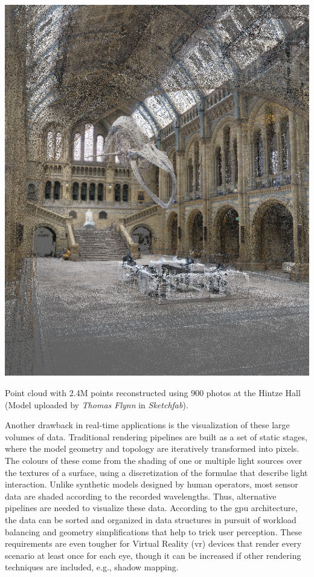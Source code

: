 \begin{marginfigure}[.5cm]
	\includegraphics{figs/introduction/hintze.png}
	\caption{Point cloud with 2.4M points reconstructed using 900 photos at the Hintze Hall (Model uploaded by \textit{Thomas Flynn} in \textit{Sketchfab}).  }
	\label{fig:hintze_hall}
\end{marginfigure}
Another drawback in real-time applications is the visualization of these large volumes of data. Traditional rendering pipelines are built as a set of static stages, where the model geometry and topology are iteratively transformed into pixels. The colours of these come from the shading of one or multiple light sources over the textures of a surface, using a discretization of the formulae that describe light interaction. Unlike synthetic models designed by human operators, most sensor data are shaded according to the recorded wavelengths. Thus, alternative pipelines are needed to visualize these data. According to the \acrshort{gpu} architecture, the data can be sorted and organized in data structures in pursuit of workload balancing and geometry simplifications that help to trick user perception. These requirements are even tougher for Virtual Reality (\acrshort{vr}) devices that render every scenario at least once for each eye, though it can be increased if other rendering techniques are included, e.g., shadow mapping.  

